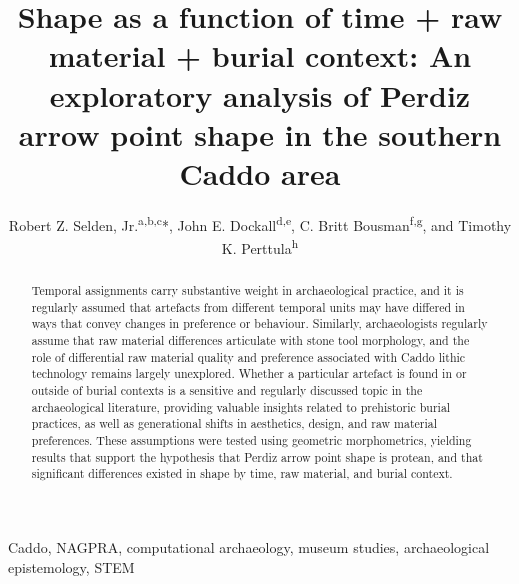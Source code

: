 \documentclass[review]{elsarticle}
\begin{document}
\begin{frontmatter}

\title{Shape as a function of time + raw material + burial context: An exploratory analysis of Perdiz arrow point shape in the southern Caddo area}

\author{Robert Z. Selden, Jr.\textsuperscript{a,b,c}*, John E. Dockall\textsuperscript{d,e}, C. Britt Bousman\textsuperscript{f,g}, and Timothy K. Perttula\textsuperscript{h}}
\address[1]{Heritage Research Center, Stephen F. Austin State University, US}
\address[2]{Cultural Heritage Department, Jean Monnet University, FR}
\address[3]{ORCID ID \href{http://orcid.org/0000-0002-1789-8449}{0000-0002-1789-8449}}
\address[4]{Cox|McClain Environmental Consulting, Inc., US}
\address[5]{ORCID ID \href{http://orcid.org/0000-0002-0940-7144}{0000-0002-0940-7144}}
\address[6]{Department of Anthropology, Texas State University, US}
\address[7]{ORCID ID \href{http://orcid.org/0000-0002-1645-8302}{0000-0002-1645-8302}}
\address[8]{Archeological \& Environmental Consultants, LLC, US}

\begin{abstract}
Temporal assignments carry substantive weight in archaeological practice, and it is regularly assumed that artefacts from different temporal units may have differed in ways that convey changes in preference or behaviour. Similarly, archaeologists regularly assume that raw material differences articulate with stone tool morphology, and the role of differential raw material quality and preference associated with Caddo lithic technology remains largely unexplored. Whether a particular artefact is found in or outside of burial contexts is a sensitive and regularly discussed topic in the archaeological literature, providing valuable insights related to prehistoric burial practices, as well as generational shifts in aesthetics, design, and raw material preferences. These assumptions were tested using geometric morphometrics, yielding results that support the hypothesis that Perdiz arrow point shape is protean, and that significant differences existed in shape by time, raw material, and burial context.
\end{abstract}

\begin{keyword}
Caddo, NAGPRA, computational archaeology, museum studies, archaeological epistemology, STEM
\end{keyword}

\end{frontmatter}
\end{document}
